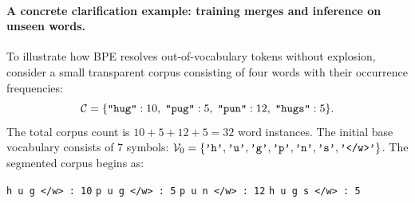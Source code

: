 \documentclass[../../main.tex]{subfiles}
\begin{document}
\paragraph{A concrete clarification example: training merges and inference on unseen words.}
To illustrate how BPE resolves out-of-vocabulary tokens without explosion, consider a small transparent corpus consisting of four words with their occurrence frequencies:
\begin{equation}
\label{eq:toy_bpe_corpus}
\mathcal{C} = \{\text{\texttt{"hug"}}: 10, \; \text{\texttt{"pug"}}: 5, \; \text{\texttt{"pun"}}: 12, \; \text{\texttt{"hugs"}}: 5\}.
\end{equation}
The total corpus count is $10 + 5 + 12 + 5 = 32$ word instances.
The initial base vocabulary consists of 7 symbols: $\mathcal{V}_0 = \{\text{\texttt{'h'}}, \text{\texttt{'u'}}, \text{\texttt{'g'}}, \text{\texttt{'p'}}, \text{\texttt{'n'}}, \text{\texttt{'s'}}, \text{\texttt{'</w>'}}\}$.
The segmented corpus begins as:
\begin{center}
\texttt{h u g </w> : 10} \qquad \texttt{p u g </w> : 5} \qquad \texttt{p u n </w> : 12} \qquad \texttt{h u g s </w> : 5}
\end{center}
\end{document}
